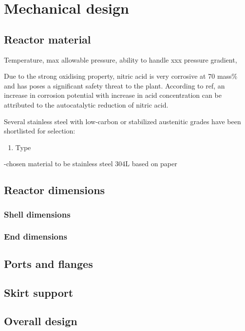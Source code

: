 \section{Mechanical design}
\subsection{Reactor material}
Temperature, max allowable pressure, ability to handle xxx pressure gradient, 

Due to the strong oxidising property, nitric acid is very corrosive at 70 mass\% and has poses a significant safety threat to the plant. According to ref, an increase in corrosion potential with increase in acid concentration can be attributed to the autocatalytic reduction of nitric acid. 

Several stainless steel with low-carbon or stabilized austenitic grades have been shortlisted for selection: 
\begin{enumerate}
    \item Type
\end{enumerate}


-chosen material to be stainless steel 304L based on paper
\subsection{Reactor dimensions}
\subsubsection{Shell dimensions}
\subsubsection{End dimensions}
\subsection{Ports and flanges}
\subsection{Skirt support}
\subsection{Overall design}

